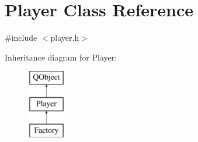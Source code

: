 \hypertarget{class_player}{}\section{Player Class Reference}
\label{class_player}


{\ttfamily \#include $<$player.\+h$>$}

Inheritance diagram for Player\+:\begin{figure}[H]
\begin{center}
\leavevmode
\includegraphics[height=3.000000cm]{class_player}
\end{center}
\end{figure}
